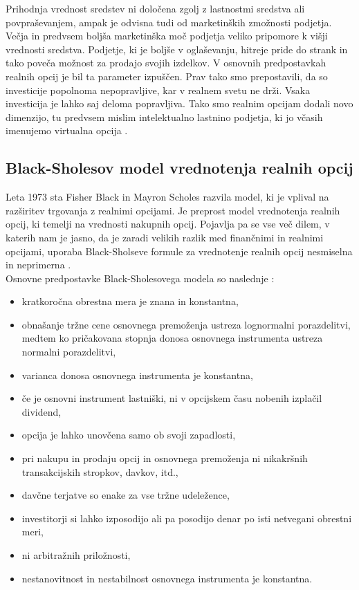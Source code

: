 Prihodnja vrednost sredstev ni določena zgolj z lastnostmi sredstva ali povpraševanjem, ampak je odvisna tudi od marketinških zmožnosti podjetja. Večja in predvsem boljša marketinška moč podjetja veliko pripomore k višji vrednosti sredstva. Podjetje, ki je boljše v oglaševanju, hitreje pride do strank in tako poveča možnost za prodajo svojih izdelkov. V osnovnih predpostavkah realnih opcij je bil ta parameter izpuščen. Prav tako smo prepostavili, da so investicije popolnoma nepopravljive, kar v realnem svetu ne drži. Vsaka investicija je lahko saj deloma popravljiva. Tako smo realnim opcijam dodali novo dimenzijo, tu predvsem mislim intelektualno lastnino podjetja, ki jo včasih imenujemo virtualna opcija \cite[str. 43]{Brach}.  \\

\subsection{Black-Sholesov model vrednotenja realnih opcij}
Leta 1973 sta Fisher Black in Mayron Scholes razvila model, ki je vplival na razširitev trgovanja z realnimi opcijami. Je preprost model vrednotenja realnih opcij, ki temelji na vrednosti nakupnih opcij. Pojavlja pa se vse več dilem, v katerih nam je jasno, da je zaradi velikih razlik med finančnimi in realnimi opcijami, uporaba Black-Sholseve formule za vrednotenje realnih opcij nesmiselna in neprimerna \cite[str. 48]{Brach}. \\

Osnovne predpostavke Black-Sholesovega modela so naslednje \cite[str. 19]{Mohar}:
\begin{itemize}
\item kratkoročna obrestna mera je znana in konstantna,
\item obnašanje tržne cene osnovnega premoženja ustreza lognormalni porazdelitvi, medtem ko pričakovana stopnja donosa osnovnega instrumenta ustreza normalni porazdelitvi,
\item varianca donosa osnovnega instrumenta je konstantna,
\item če je osnovni instrument lastniški, ni v opcijskem času nobenih izplačil dividend,
\item opcija je lahko unovčena samo ob svoji zapadlosti,
\item pri nakupu in prodaju opcij in osnovnega premoženja ni nikakršnih transakcijskih stropkov, davkov, itd.,
\item davčne terjatve so enake za vse tržne udeležence,
\item investitorji si lahko izposodijo ali pa posodijo denar po isti netvegani obrestni meri,
\item ni arbitražnih priložnosti,
\item nestanovitnost in nestabilnost osnovnega instrumenta je konstantna.
\end{itemize}

